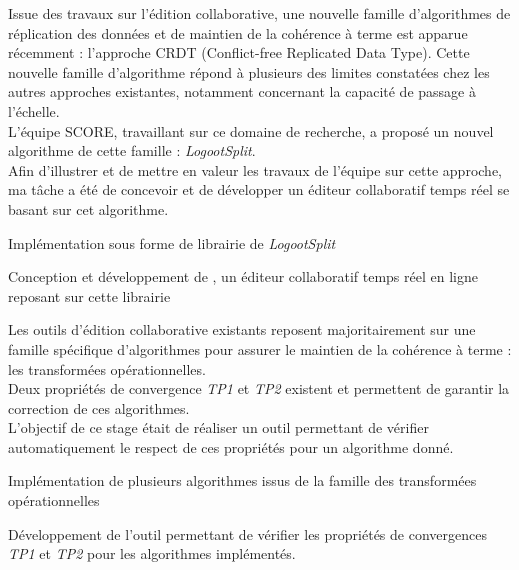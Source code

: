 \documentclass[]{deedy-resume-openfont}
\begin{document}
\hfill\begin{minipage}{\dimexpr\textwidth-0.5cm}
Issue des travaux sur l'édition collaborative, une nouvelle famille d'algorithmes de réplication des données
et de maintien de la cohérence à terme est apparue récemment : l'approche CRDT (Conflict-free Replicated Data Type).
Cette nouvelle famille d'algorithme répond à plusieurs des limites constatées chez les autres approches existantes,
notamment concernant la capacité de passage à l'échelle.
\\
L'équipe SCORE, travaillant sur ce domaine de recherche, a proposé un nouvel algorithme de cette famille : \emph{LogootSplit}.
\\
Afin d'illustrer et de mettre en valeur les travaux de l'équipe sur cette approche,
ma tâche a été de concevoir et de développer un éditeur collaboratif temps réel se basant sur cet algorithme.
\begin{tightemize}
\item Implémentation sous forme de librairie de \emph{LogootSplit}
\item Conception et développement de \href{https://www.coedit.re}{}, un éditeur collaboratif temps réel en ligne reposant sur cette librairie
\end{tightemize}
\sectionsep\xdef\tpd{\the\prevdepth}
\end{minipage}

\sectionsep

\hfill\begin{minipage}{\dimexpr\textwidth-0.5cm}
Les outils d'édition collaborative existants reposent majoritairement sur une famille spécifique d'algorithmes
pour assurer le maintien de la cohérence à terme : les transformées opérationnelles.
\\
Deux propriétés de convergence \emph{TP1} et \emph{TP2} existent et permettent de garantir la correction de ces algorithmes.
\\
L'objectif de ce stage était de réaliser un outil permettant de vérifier automatiquement le respect de ces propriétés pour un algorithme donné.
\begin{tightemize}
\item Implémentation de plusieurs algorithmes issus de la famille des transformées opérationnelles
\item Développement de l'outil permettant de vérifier les propriétés de convergences \emph{TP1} et \emph{TP2} pour les algorithmes implémentés.
\end{tightemize}
\sectionsep\xdef\tpd{\the\prevdepth}
\end{minipage}
\end{document}
